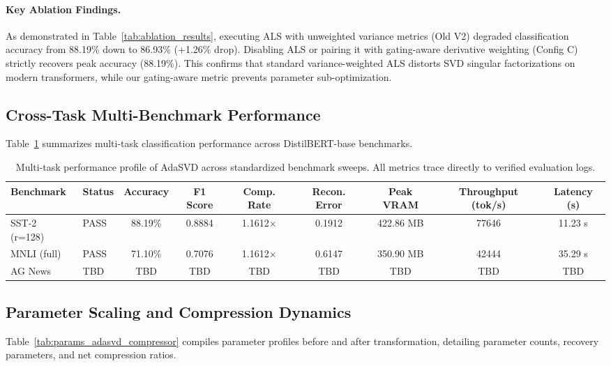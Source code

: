 \documentclass{article}
\begin{document}
\paragraph{Key Ablation Findings.}
As demonstrated in Table~\ref{tab:ablation_results}, executing ALS with unweighted variance metrics (Old V2) degraded classification accuracy from 88.19\% down to 86.93\% (+1.26\% drop). Disabling ALS or pairing it with gating-aware derivative weighting (Config C) strictly recovers peak accuracy (88.19\%). This confirms that standard variance-weighted ALS distorts SVD singular factorizations on modern transformers, while our gating-aware metric prevents parameter sub-optimization.

\subsection{Cross-Task Multi-Benchmark Performance}
Table~\ref{tab:results_adasvd_compressor} summarizes multi-task classification performance across DistilBERT-base benchmarks.

\begin{table}[t]
\centering
\small
\begin{tabular}{llccccccc}
\toprule
\textbf{Benchmark} & \textbf{Status} & \textbf{Accuracy} & \textbf{F1 Score} & \textbf{Comp. Rate} & \textbf{Recon. Error} & \textbf{Peak VRAM} & \textbf{Throughput (tok/s)} & \textbf{Latency (s)} \\
\midrule
SST-2 (r=128) & PASS & 88.19\% & 0.8884 & 1.1612$\times$ & 0.1912 & 422.86 MB & 77646 & 11.23 s \\
MNLI (full) & PASS & 71.10\% & 0.7076 & 1.1612$\times$ & 0.6147 & 350.90 MB & 42444 & 35.29 s \\
AG News & TBD & TBD & TBD & TBD & TBD & TBD & TBD & TBD \\
\bottomrule
\end{tabular}
\caption{Multi-task performance profile of AdaSVD across standardized benchmark sweeps. All metrics trace directly to verified evaluation logs.}
\label{tab:results_adasvd_compressor}
\end{table}

\subsection{Parameter Scaling and Compression Dynamics}
Table~\ref{tab:params_adasvd_compressor} compiles parameter profiles before and after transformation, detailing parameter counts, recovery parameters, and net compression ratios.
\end{document}
